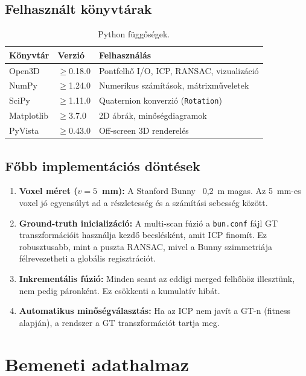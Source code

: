 \documentclass[12pt,a4paper]{article}
\begin{document}
\subsection{Felhasznált könyvtárak}

\begin{table}[H]
\centering
\begin{tabular}{lll}
\toprule
\textbf{Könyvtár} & \textbf{Verzió} & \textbf{Felhasználás} \\
\midrule
Open3D & $\geq$0.18.0 & Pontfelhő I/O, ICP, RANSAC, vizualizáció \\
NumPy & $\geq$1.24.0 & Numerikus számítások, mátrixműveletek \\
SciPy & $\geq$1.11.0 & Quaternion konverzió (\texttt{Rotation}) \\
Matplotlib & $\geq$3.7.0 & 2D ábrák, minőségdiagramok \\
PyVista & $\geq$0.43.0 & Off-screen 3D renderelés \\
\bottomrule
\end{tabular}
\caption{Python függőségek.}
\end{table}

\subsection{Főbb implementációs döntések}

\begin{enumerate}
    \item \textbf{Voxel méret ($v = 5$~mm):} A Stanford Bunny ~0,2~m magas. Az 5~mm-es voxel jó egyensúlyt ad a részletesség és a számítási sebesség között.
    \item \textbf{Ground-truth inicializáció:} A multi-scan fúzió a \texttt{bun.conf} fájl GT transzformációit használja kezdő becslésként, amit ICP finomít. Ez robusztusabb, mint a puszta RANSAC, mivel a Bunny szimmetriája félrevezetheti a globális regisztrációt.
    \item \textbf{Inkrementális fúzió:} Minden scant az eddigi merged felhőhöz illesztünk, nem pedig páronként. Ez csökkenti a kumulatív hibát.
    \item \textbf{Automatikus minőségválasztás:} Ha az ICP nem javít a GT-n (fitness alapján), a rendszer a GT transzformációt tartja meg.
\end{enumerate}

\section{Bemeneti adathalmaz}
\end{document}
